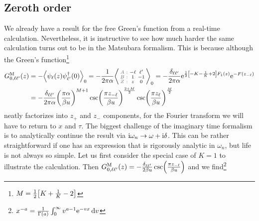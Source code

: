 \documentclass[english, parskip=full]{scrartcl}
\begin{document}
\subsection{Zeroth order}
We already have a result for the free Green's function from a real-time calculation.
Nevertheless, it is instructive to see how much harder the same calculation turns out to be in the Matsubara formalism.
This is because although the Green's function\footnote{$M=\frac{1}{2}\klb*{K + \frac{1}{K} - 2}$}
\begin{align}
G_{0,\ell\ell'}^\M(z) &= -\bra*{\psi_{\ell}(z) \psi_{\ell'}^\dagger(0)}_0 = -\frac{1}{2\pi\alpha} \bra*{\zabx{-\ell&\ell'}{1&-1}{z&0}}_0 = -\frac{\delta_{\ell\ell'}}{2\pi\alpha} \powe{\frac{1}{2} \klb*{-K-\frac{1}{K}+2} F_1(z)} \powe{-F(z_{-\ell})}\\
&= -\frac{\delta_{\ell\ell'}}{2\pi\alpha} \kla*{\frac{\pi\alpha}{\beta u}}^{M+1} \csc\kla*{\frac{\pi z_{-\ell}}{\beta u}}^\frac{2+M}{2} \csc\kla*{\frac{\pi z_\ell}{\beta u}}^\frac{M}{2}
\end{align}
neatly factorizes into $z_+$ and $z_-$ components, for the Fourier transform we will have to return to $x$ and $\tau$.
The biggest challenge of the imaginary time formalism is to  analytically continue the result via $\text{i}\omega_n\rightarrow \omega + \text{i}\delta$.
This can be rather straightforward if one has an expression that is rigorously analytic in $\omega_n$, but life is not always so simple.
Let us first consider the special case of $K=1$ to illustrate the calculation.
Then $G_{0,\ell\ell'}^\M(z) = -\frac{\delta_{\ell\ell'}}{2\beta u} \csc\kla*{\frac{\pi z_{-\ell}}{\beta u}}$ and we find\footnote{$x^{-a} = \frac{1}{\Gamma(a)} \int_{0}^{\infty} v^{a-1} \text{e}^{-vx} \,\mathrm{d}v$}
\end{document}
